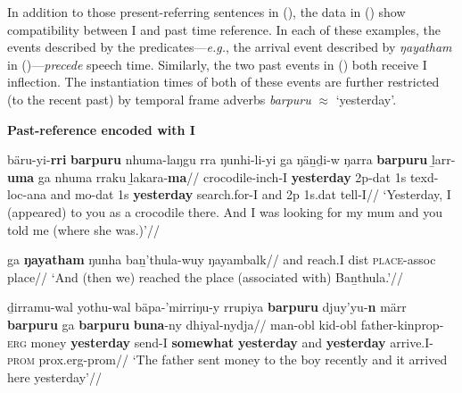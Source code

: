 In addition to those present-referring sentences in (), the data in () show compatibility between \gls{I} and past time reference. In each of these examples, the events described by the predicates---\textit{e.g.}, the arrival event described by \textit{ŋayatham} in ()---\textit{precede} speech time. Similarly, the two past events in () both receive \gls{I} inflection. The instantiation times of both of these events are further restricted (to the recent past) by temporal frame adverbs \textit{barpuru} $\approx$ `yesterday'. %

\pex\textbf{Past-reference encoded with \gls{I}}


\a\begingl\gla bäru-yi-\textbf{rri} \textbf{barpuru} nhuma-laŋgu rra ŋunhi-li-yi ga ŋäṉḏi-w ŋarra \textbf{barpuru} ḻarr-\textbf{uma} ga nhuma rraku ḻakara-\textbf{ma}//
\glb crocodile-\gls{inch}-\gls{I} \textbf{yesterday} 2p-\gls{dat} 1s \gls{texd}-\gls{loc}-\gls{ana} and \gls{mo}-\gls{dat} 1s \textbf{yesterday} search.for-\gls{I} and 2p 1s.\gls{dat} tell-\gls{I}//
\glft`Yesterday, I (appeared) to you as a crocodile there. And I was looking for my mum and you told me (where she was.)'//\endgl

\a{}\begingl\gla ga \textbf{ŋayatham} ŋunha baṉ'thula-wuy ŋayambalk//
\glb and reach.\gls{I} \gls{dist} \textsc{place}-\gls{assoc} place//
\glft`And (then we) reached the place (associated with) Baṉthula.'//\endgl



\a{}\begingl\gla ḏirramu-wal yothu-wal bäpa-'mirriŋu-y rrupiya \textbf{barpuru} djuy'yu-\textbf{n} märr \textbf{barpuru} ga \textbf{barpuru} \textbf{buna}-ny dhiyal-nydja//
\glb man-\gls{obl} kid-\gls{obl} father-\gls{kinprop}-\textsc{erg} money \textbf{yesterday} send-\gls{I} \textbf{somewhat} \textbf{yesterday} and \textbf{yesterday} arrive.\gls{I}-\textsc{prom} \gls{prox}.\gls{erg}-\gls{prom}//
\glft`The father sent money to the boy recently and it arrived here yesterday'//\endgl

